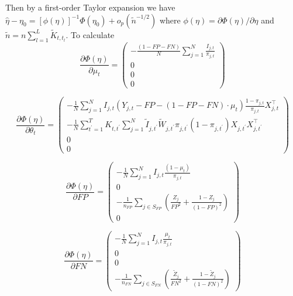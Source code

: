 \documentclass[11pt]{amsart}
\numberwithin{equation}{section}
\theoremstyle{plain}
\begin{document}
Then by a first-order Taylor expansion we have $\hat \eta - \eta_0 = \left[ \phi (\eta) \right]^{-1} \Phi(\eta_0) + o_p (\tilde n^{-1/2})$ where $\phi(\eta) = \partial \Phi (\eta)/\partial \eta$ and $\tilde n = n \sum_{l=1}^L \tilde K_{t,t_l}$.  To calculate
$$
\frac{\partial \Phi (\eta)}{\partial \mu_t} =
\left (
\begin{array}{c}
-\frac{(1-FP-FN)}{N} \sum_{j=1}^N \frac{I_{j,t}}{\pi_{j,t}} \\
0 \\
0 \\
0
\end{array}
\right )
$$

$$
\frac{\partial \Phi (\eta)}{\partial \theta_t} =
\left (
\begin{array}{c}
-\frac{1}{N} \sum_{j=1}^N I_{j,t} (Y_{j,t} - FP - (1-FP-FN) \cdot \mu_t) \frac{1-\pi_{j,t}}{\pi_{j,t}} X_{j,t}^\top \\
- \frac{1}{N} \sum_{t^\prime = 1}^T K_{t,t^\prime} \sum_{j = 1}^N \tilde I_{j,t^\prime} \tilde W_{j,t^\prime}  \pi_{j,t^\prime} (1-\pi_{j,t^\prime}) X_{j,t^\prime} X_{j,t^\prime}^\top\\
0 \\
0
\end{array}
\right )
$$

$$
\frac{\partial \Phi (\eta)}{\partial FP} =
\left (
\begin{array}{c}
-\frac{1}{N} \sum_{j=1}^N I_{j,t} \frac{(1-\mu_t)}{\pi_{j,t}} \\
0\\
-\frac{1}{n_{FP}} \sum_{j \in S_{FP}} \left( \frac{Z_j}{FP^2} + \frac{1-Z_j}{(1-FP)^2} \right)  \\
0
\end{array}
\right )
$$

$$
\frac{\partial \Phi (\eta)}{\partial FN} =
\left (
\begin{array}{c}
- \frac{1}{N} \sum_{j=1}^N I_{j,t} \frac{\mu_t}{\pi_{j,t}} \\
0\\
0 \\
-\frac{1}{n_{FN}}  \sum_{j \in S_{FN}} \left( \frac{\tilde Z_j}{FN^2} + \frac{1-\tilde Z_j}{(1-FN)^2} \right)
\end{array}
\right )
$$
\end{document}
